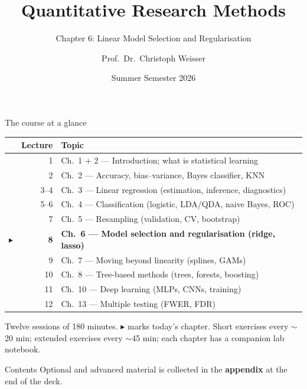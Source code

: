 \documentclass[aspectratio=169,11pt]{beamer}
\title{Quantitative Research Methods}
\subtitle{Chapter 6: Linear Model Selection and Regularisation}
\author{Prof.\ Dr.\ Christoph Weisser}\institute{HSBI}
\date{Summer Semester 2026}\graphicspath{{images/}}
\begin{document}
\begin{frame}[plain]\titlepage\end{frame}

\begin{frame}{The course at a glance}
  \footnotesize
  \begin{center}
  \begin{tabular}{@{}c r l@{}}
    & \textbf{Lecture} & \textbf{Topic}\\
    \midrule
     & 1 & Ch.\ 1 + 2 --- Introduction; what is statistical learning \\
     & 2 & Ch.\ 2 --- Accuracy, bias--variance, Bayes classifier, KNN \\
     & 3--4 & Ch.\ 3 --- Linear regression (estimation, inference, diagnostics) \\
     & 5--6 & Ch.\ 4 --- Classification (logistic, LDA/QDA, naive Bayes, ROC) \\
     & 7 & Ch.\ 5 --- Resampling (validation, CV, bootstrap) \\
    $\blacktriangleright$ & \textbf{8} & \textbf{Ch.\ 6 --- Model selection and regularisation (ridge, lasso)} \\
     & 9 & Ch.\ 7 --- Moving beyond linearity (splines, GAMs) \\
     & 10 & Ch.\ 8 --- Tree-based methods (trees, forests, boosting) \\
     & 11 & Ch.\ 10 --- Deep learning (MLPs, CNNs, training) \\
     & 12 & Ch.\ 13 --- Multiple testing (FWER, FDR) \\
  \end{tabular}
  \end{center}
  \vspace{2pt}
  {\scriptsize Twelve sessions of 180 minutes. $\blacktriangleright$ marks today's chapter. Short exercises every $\sim$20 min; extended exercises every $\sim$45 min; each chapter has a companion lab notebook.}
\end{frame}


\begin{frame}{Contents}\small
  \tableofcontents[hideallsubsections]
  \vfill
  {\tiny Optional and advanced material is collected in the \textbf{appendix} at the end of the deck.}
\end{frame}
\end{document}
